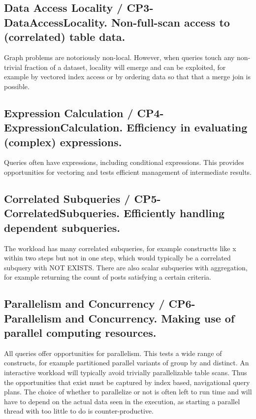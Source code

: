 \subsection*{Data Access Locality / CP3-DataAccessLocality. Non-full-scan access to (correlated) table data.}

Graph problems are notoriously non-local.  However, when queries touch
any non-trivial fraction of a dataset, locality will emerge and can be
exploited, for example by vectored index access or by ordering data so
that that a merge join is possible.

\subsection*{Expression Calculation / CP4-ExpressionCalculation. Efficiency in evaluating (complex) expressions.}

Queries often have expressions, including conditional expressions.
This provides opportunities for vectoring and tests efficient
management of intermediate results.

\subsection*{Correlated Subqueries / CP5-CorrelatedSubqueries. Efficiently handling dependent subqueries.}

The workload has many correlated subqueries, for example constructts
like x within two steps but not in one step, which would typically be
a correlated subquery with NOT EXISTS.  There are also scalar
subqueries with aggregation, for example returning the count of posts
satisfying a certain criteria.


\subsection*{Parallelism and Concurrency / CP6-Parallelism and Concurrency. Making use of parallel computing resources.}

All queries offer opportunities for parallelism.  This tests a wide
range of constructs, for example partitioned parallel variants of
group by and distinct.  An interactive workload will typically avoid
trivially parallelizable table scans.  Thus the opportunities that
exist must be captured by index based, navigational query plans.  The
choice of whether to parallelize or not is often left to run time and
will have to depend on the actual data seen in the execution, as
starting a parallel thread with too little to do is
counter-productive.


